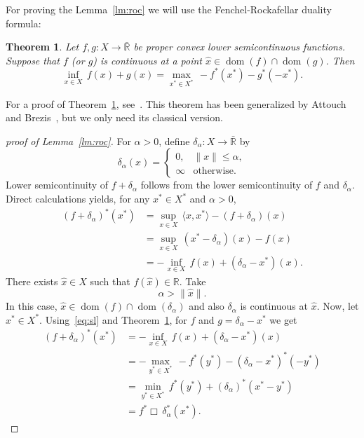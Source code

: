 \documentclass[11pt]{article}
\newcommand{\R}{\mathbb{R}}
\newcommand{\BR}{\bar{\mathbb{R}}}
\DeclareMathOperator{\ed}{dom}
\newcommand{\inner}[2]{\langle{#1},{#2}\rangle}
\newcommand{\norm}[1]{\|#1\|}
\newtheorem{theorem}{Theorem}[section]
\begin{document}
For proving the Lemma~\ref{lm:roc} we will use the Fenchel-Rockafellar
duality formula:
%
\begin{theorem}\label{teo:fr}
  Let $f,g:X\to \BR$ be proper convex lower semicontinuous functions.
  Suppose that $f$ (or $g$) is continuous at a point $\hat x \in
  \ed(f)\cap \ed(g)$.  Then
%
\begin{equation} \label{eq:fr}
  \inf_{x \in X}\,f(x) + g(x)=\max_{x^* \in X^*}\,- f^*(x^*)-g^*(-x^*).
\end{equation}
%
\end{theorem}
For a proof of Theorem~\ref{teo:fr}, see~\cite{brezis}. This theorem
has been generalized by Attouch and Brezis~\cite{att-brez}, but we only need 
 its classical version.
\begin{proof}[proof of Lemma~\ref{lm:roc}]
For $\alpha>0$, define $\delta_\alpha:X\to \BR$ by
\[
 \delta_\alpha(x)=
 \begin{cases}
    0,& \|x\|\leq \alpha,\\
    \infty&   \mbox{otherwise}.
  \end{cases}
\]
Lower semicontinuity of $f+\delta_\alpha$ follows from the lower
semicontinuity of $f$ and $\delta_\alpha$.
Direct calculations yields, for any $x^*\in X^*$ and $\alpha>0$,
%
\begin{align}\label{eq:sl}
 \nonumber
 (f+\delta_\alpha)^*(x^*)&=\sup_{x\in X}\,\inner{x}{x^*}-(f+\delta_\alpha)(x)\\
 \nonumber               &=\sup_{x\in X}\,(x^*-\delta_\alpha)(x)-f(x)\\
                         &=-\inf_{x\in X}\,f(x)+(\delta_\alpha-x^*)(x).
 \end{align}
%
There exists $\hat x\in X$ such that $f(\hat x)\in\R$. Take 
\begin{equation}
  \label{eq:alpha}
  \alpha>\norm{\hat x}.
\end{equation}
In this case, $\hat x\in \ed(f)\cap \ed(\delta_\alpha)$
 and also $\delta_\alpha$ is continuous at $\hat x$.
%
 Now, let $x^*\in X^*$. Using~\eqref{eq:sl} and Theorem~\ref{teo:fr},
 for $f$ and $g=\delta_\alpha-x^*$ we get
%
\begin{align*}
 (f+\delta_\alpha)^*(x^*)&=-\inf_{x\in X}\,f(x)+(\delta_\alpha-x^*)(x)\\
                         &=-\max_{y^*\in X^*}\,-f^*(y^*)-(\delta_\alpha-x^*)^*(-y^*)\\
                         &=\min_{y^*\in X^*}\,f^*(y^*)+(\delta_\alpha)^*(x^*-y^*)\\
                         &= f^*\Box\, \delta_\alpha^*(x^*).

\end{align*}
\end{proof}
\end{document}
